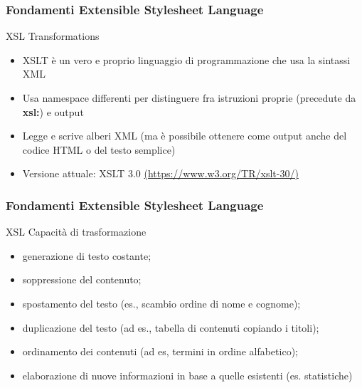 \begin{frame}
    \frametitle{Fondamenti Extensible Stylesheet Language}
    \addtocounter{nframe}{1}
    

     \begin{block}{XSL Transformations}
         \begin{itemize}
            \item XSLT è un vero e proprio linguaggio di programmazione che usa la sintassi XML
            \item Usa namespace differenti per distinguere fra istruzioni proprie (precedute da \textbf{xsl:}) e output
            \item Legge e scrive alberi XML (ma è possibile ottenere come output anche del
            codice HTML o del testo semplice)
            \item Versione attuale: XSLT 3.0 \url{(https://www.w3.org/TR/xslt-30/)}
        \end{itemize}
     \end{block}
    
\end{frame}

\begin{frame}
    \frametitle{Fondamenti Extensible Stylesheet Language}
    \addtocounter{nframe}{1}
    

     \begin{block}{XSL Capacità di trasformazione}
         \begin{itemize}
            \item generazione di testo costante;
            \item soppressione del contenuto;
            \item spostamento del testo (es., scambio ordine di nome e cognome);
            \item duplicazione del testo (ad es., tabella di contenuti copiando i titoli);
            \item ordinamento dei contenuti (ad es, termini in ordine alfabetico);
            \item elaborazione di nuove informazioni in base a quelle esistenti (es. statistiche)
        \end{itemize}
     \end{block}
    
\end{frame}

